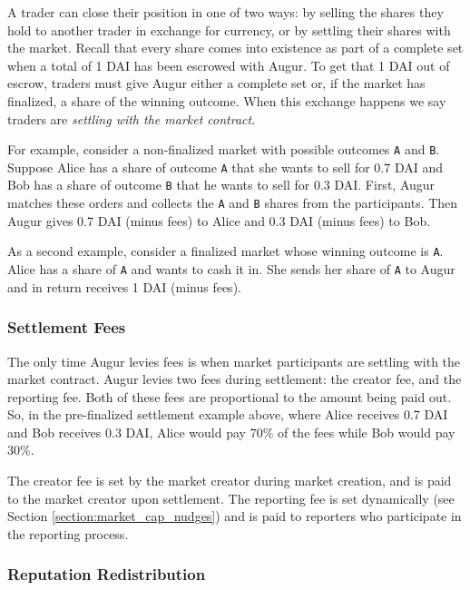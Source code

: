 \documentclass[floatfix,reprint,nofootinbib,amsmath,amssymb,epsfig,pre,floats,letterpaper,groupedaffiliation]{revtex4-1}
\theoremstyle{definition}
\theoremstyle{definition}
\begin{document}
A trader can close their position in one of two ways: by selling the shares they hold to another trader in exchange for currency, or by settling their shares with the market.  Recall that every share comes into existence as part of a complete set when a total of 1 DAI has been escrowed with Augur.  To get that 1 DAI out of escrow, traders must give Augur either a complete set or, if the market has finalized, a share of the winning outcome.  When this exchange happens we say traders are \textit{settling with the market contract}.

For example, consider a non-finalized market with possible outcomes \texttt{A} and \texttt{B}.  Suppose Alice has a share of outcome \texttt{A} that she wants to sell for 0.7 DAI and Bob has a share of outcome \texttt{B} that he wants to sell for 0.3 DAI. First, Augur matches these orders and collects the \texttt{A} and \texttt{B} shares from the participants. Then Augur gives 0.7 DAI (minus fees) to Alice and 0.3 DAI (minus fees) to Bob.

As a second example, consider a finalized market whose winning outcome is \texttt{A}.  Alice has a share of \texttt{A} and wants to cash it in.  She sends her share of \texttt{A} to Augur and in return receives 1 DAI (minus fees).

\subsubsection{Settlement Fees}

The only time Augur levies fees is when market participants are settling with the market contract.  Augur levies two fees during settlement: the creator fee, and the reporting fee. Both of these fees are proportional to the amount being paid out.  So, in the pre-finalized settlement example above, where Alice receives 0.7 DAI and Bob receives 0.3 DAI, Alice would pay 70\% of the fees while Bob would pay 30\%.

The creator fee is set by the market creator during market creation, and is paid to the market creator upon settlement.  The reporting fee is set dynamically (see Section \ref{section:market_cap_nudges}) and is paid to reporters who participate in the reporting process.

\subsubsection{Reputation Redistribution}\label{section:rep_redistribution}
\end{document}

